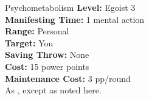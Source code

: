 {Psychometabolism}
{
	\textbf{Level:}
	Egoist 3\\
	\textbf{Manifesting Time:}
	1 mental action\\
	\textbf{Range:}
	Personal\\
	\textbf{Target:}
	You\\
	\textbf{Saving Throw:}
	None\\
	\textbf{Cost:}
	15 power points\\
	\textbf{Maintenance Cost:}
	3 pp/round\\
}
{
	As , except as noted here.
}
